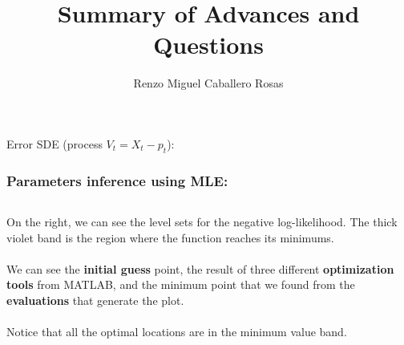 \documentclass[aspectratio=169]{beamer}\usepackage[utf8]{inputenc}
\title{Summary of Advances and Questions}
\subtitle{Renzo Miguel Caballero Rosas}
\begin{document}
\begin{frame}
\titlepage
\end{frame}


\begin{frame}

{\Huge Error SDE (process $V_t=X_t-p_t$):}

\end{frame}


\begin{frame}\frametitle{Parameters inference using MLE:} \label{MLE}

\begin{columns}

On the right, we can see the level sets for the negative log-likelihood. The thick violet band is the region where the function reaches its minimums.\\
\quad\\
We can see the \textbf{initial guess} point, the result of three different \textbf{optimization tools} from MATLAB, and the minimum point that we found from the \textbf{evaluations} that generate the plot.\\
\quad\\
Notice that all the optimal locations are in the minimum value band.


\end{columns}
\end{frame}
\end{document}
